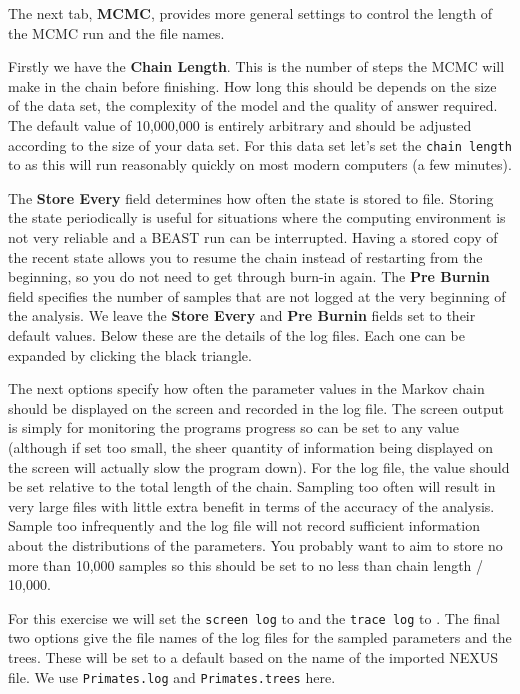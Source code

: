 \documentclass[11pt]{article}
\theoremstyle{plain}%
\theoremstyle{definition}
\theoremstyle{remark}
\begin{document}
The next tab, {\bf MCMC}, provides more general
settings to control the length of the MCMC run and the file names. 

Firstly we have the \textbf{Chain Length}. This is the number of
steps the MCMC will make in the chain before finishing. How long this
should be depends on the size of the data set, the complexity of the
model and the quality of answer required. The default value of 10,000,000
is entirely arbitrary and should be adjusted according to the size
of your data set. For this data set let's set the \texttt{chain
length} to \underline{\chainLength{}} as this will run reasonably quickly on most modern
computers (a few minutes).


The \textbf{Store Every} field determines how often the state is stored to file. Storing
the state periodically is useful for situations where the computing environment
is not very reliable and a BEAST run can be interrupted. Having a stored copy
of the recent state allows you to resume the chain instead of restarting from the
beginning, so you do not need to get through burn-in again.
The \textbf{Pre Burnin} field specifies the number of samples that are not logged at the very beginning of
the analysis. We leave the \textbf{Store Every} and \textbf{Pre Burnin} fields set to their default
values. Below these are the details of the log files. Each one can be expanded by
clicking the black triangle.

The next options specify how often the parameter values in the Markov
chain should be displayed on the screen and recorded in the log file.
The screen output is simply for monitoring the programs progress so
can be set to any value (although if set too small, the sheer quantity
of information being displayed on the screen will actually slow the
program down). For the log file, the value should be set relative
to the total length of the chain. Sampling too often will result in
very large files with little extra benefit in terms of the accuracy
of the analysis. Sample too infrequently and the log file will not
record sufficient information about the distributions of the parameters. 
You probably want to aim to store no more than 10,000 samples so this should be
set to no less than chain length / 10,000.

For this exercise we will set the \texttt{screen log} to \underline{\screenEvery{}} and the \texttt{trace log} to \underline{\logEvery{}}. The final two
options give the file names of the log files for the sampled parameters and
the trees. These will be set to a default based on the name of the
imported NEXUS file. We use \texttt{Primates.log} and \texttt{Primates.trees} here.
\end{document}
